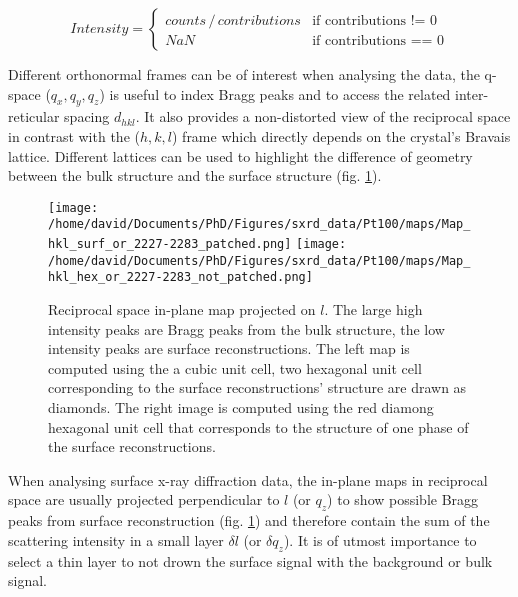 \begin{equation}
    \label{eq:BinocularsIntensity}
    Intensity =
        \begin{cases}
            counts \, /  \,contributions  & \text{if contributions != 0} \\
            NaN & \text{if contributions == 0}
        \end{cases}
\end{equation}

Different orthonormal frames can be of interest when analysing the data, the q-space ($q_x, q_y, q_z$) is useful to index Bragg peaks and to access the related inter-reticular spacing $d_{hkl}$.
It also provides a non-distorted view of the reciprocal space in contrast with the ($h, k, l$) frame which directly depends on the crystal's Bravais lattice.
Different lattices can be used to highlight the difference of geometry between the bulk structure and the surface structure (fig. \ref{fig:MapExampleBinoculars}).

\begin{figure}[!htb]
    \texttt{[image: /home/david/Documents/PhD/Figures/sxrd\_data/Pt100/maps/Map\_hkl\_surf\_or\_2227-2283\_patched.png]}
    \texttt{[image: /home/david/Documents/PhD/Figures/sxrd\_data/Pt100/maps/Map\_hkl\_hex\_or\_2227-2283\_not\_patched.png]}
    \caption{
    Reciprocal space in-plane map projected on $l$.
    The large high intensity peaks are Bragg peaks from the bulk structure, the low intensity peaks are surface reconstructions.
    The left map is computed using the a cubic unit cell, two hexagonal unit cell corresponding to the surface reconstructions' structure are drawn as diamonds.
    The right image is computed using the red diamong hexagonal unit cell that corresponds to the structure of one phase of the surface reconstructions.
    }
    \label{fig:MapExampleBinoculars}
\end{figure}

When analysing surface x-ray diffraction data, the in-plane maps in reciprocal space are usually projected perpendicular to $l$ (or $q_z$) to show possible Bragg peaks from surface reconstruction (fig. \ref{fig:MapExampleBinoculars}) and therefore contain the sum of the scattering intensity in a small layer $\delta l$ (or $\delta q_z$).
It is of utmost importance to select a thin layer to not drown the surface signal with the background or bulk signal.

